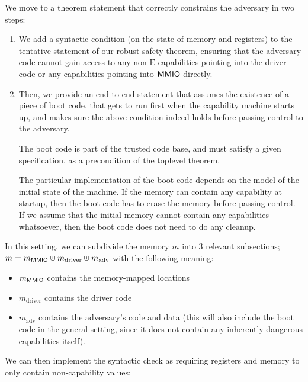 \documentclass{article}
\newcommand{\X}[1]{\ensuremath{\mathrm{#1}}}
\newcommand{\V}[1]{\ensuremath{\mathit{#1}}}
\newcommand{\MMIO}{\textlog{MMIO}\xspace}
\begin{document}
We move to a theorem statement that correctly constrains the adversary in two
steps:
%
\begin{enumerate}
  \item We add a syntactic condition (on the state of memory and registers) to
    the tentative statement of our robust safety theorem, ensuring that the
    adversary code cannot gain access to any non-$\X{E}$ capabilities pointing into
    the driver code or any capabilities pointing into $\MMIO$ directly.
%
  \item Then, we provide an end-to-end statement that assumes the existence of a
    piece of boot code, that gets to run first when the capability machine
    starts up, and makes sure the above condition indeed holds before passing
    control to the adversary.

    The boot code is part of the trusted code base, and must satisfy a given
    specification, as a precondition of the toplevel theorem.

    The particular implementation of the boot code depends on the model of the
    initial state of the machine. If the memory can contain any capability at
    startup, then the boot code has to erase the memory before passing control.
    If we assume that the initial memory cannot contain any capabilities
    whatsoever, then the boot code does not need to do any cleanup.
\end{enumerate}

In this setting, we can subdivide the memory $m$ into 3 relevant subsections;
$m = m_{\MMIO} \uplus m_{\X{driver}} \uplus m_{\X{adv}}$ %
with the following meaning:
\begin{itemize}
\item $m_{\MMIO}$ contains the memory-mapped locations
\item $m_{\X{driver}}$ contains the driver code
\item  $m_{\X{adv}}$ contains the adversary's code and data (this will also
  include the boot code in the general setting, since it does not contain any
  inherently dangerous capabilities itself).
\end{itemize}

\newcommand{\nonCap}[1]{\ensuremath{\mathrm{nonCap}(#1)}}

We can then implement the syntactic check as requiring registers and memory to
only contain non-capability values:

\def \MathparLineskip {\lineskiplimit=0.7em\lineskip=0.7em}
\end{document}
